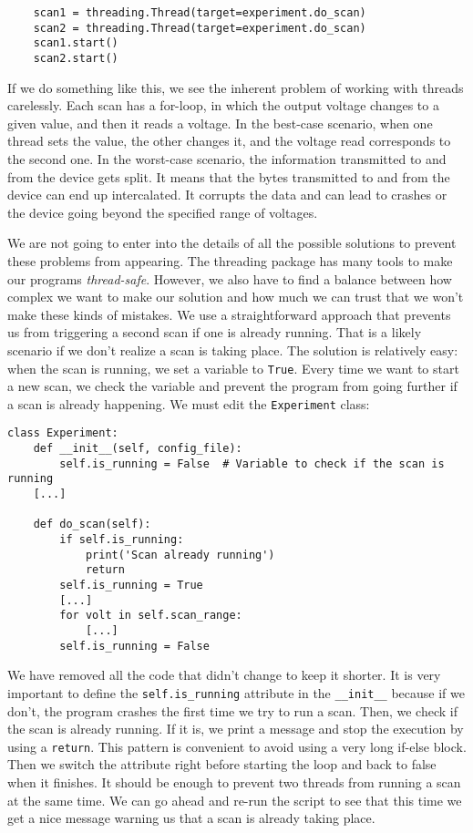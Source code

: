 \begin{verbatim}
    scan1 = threading.Thread(target=experiment.do_scan)
    scan2 = threading.Thread(target=experiment.do_scan)
    scan1.start()
    scan2.start()
\end{verbatim}

If we do something like this, we see the inherent problem of working with threads carelessly. Each scan has a for-loop, in which the output voltage changes to a given value, and then it reads a voltage. In the best-case scenario, when one thread sets the value, the other changes it, and the voltage read corresponds to the second one. In the worst-case scenario, the information transmitted to and from the device gets split. It means that the bytes transmitted to and from the device can end up intercalated. It corrupts the data and can lead to crashes or the device going beyond the specified range of voltages.

We are not going to enter into the details of all the possible solutions to prevent these problems from appearing. The threading package has many tools to make our programs \emph{thread-safe}. However, we also have to find a balance between how complex we want to make our solution and how much we can trust that we won't make these kinds of mistakes. We use a straightforward approach that prevents us from triggering a second scan if one is already running. That is a likely scenario if we don't realize a scan is taking place. The solution is relatively easy: when the scan is running, we set a variable to \texttt{True}. Every time we want to start a new scan, we check the variable and prevent the program from going further if a scan is already happening. We must edit the \texttt{Experiment} class:

\begin{verbatim}
class Experiment:
    def __init__(self, config_file):
        self.is_running = False  # Variable to check if the scan is running
    [...]

    def do_scan(self):
        if self.is_running:
            print('Scan already running')
            return
        self.is_running = True
        [...]
        for volt in self.scan_range:
            [...]
        self.is_running = False
\end{verbatim}

We have removed all the code that didn't change to keep it shorter. It is very important to define the \texttt{self.is\_running} attribute in the \texttt{\_\_init\_\_} because if we don't, the program crashes the first time we try to run a scan. Then, we check if the scan is already running. If it is, we print a message and stop the execution by using a \texttt{return}. This pattern is convenient to avoid using a very long if-else block. Then we switch the attribute right before starting the loop and back to false when it finishes. It should be enough to prevent two threads from running a scan at the same time. We can go ahead and re-run the script to see that this time we get a nice message warning us that a scan is already taking place.

